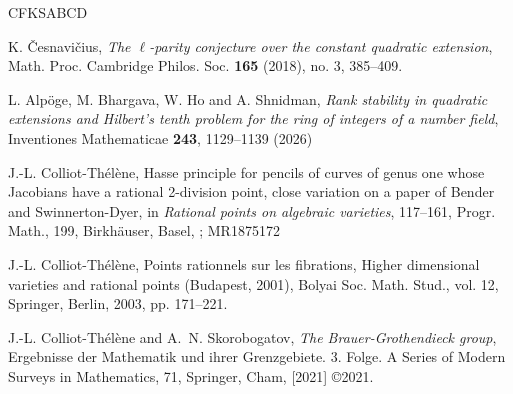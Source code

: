 \documentclass[10pt]{amsart}
\numberwithin{equation}{section}
\theoremstyle{remark}
\theoremstyle{definition}
\theoremstyle{definition}
\theoremstyle{definition}
\theoremstyle{definition}
\theoremstyle{definition}
\theoremstyle{definition}
\theoremstyle{definition}
\theoremstyle{definition}
\begin{document}
\begin{thebibliography}{CFKSABCD}
  
  
  
     

 K. \v{C}esnavi\v{c}ius, \textit{The {$\ell$}-parity conjecture over the constant quadratic
         extension}, Math. Proc. Cambridge Philos. Soc. \textbf{165} (2018), no. 3, 385--409.  
              
 L. Alpöge, M. Bhargava,  W. Ho   and A. Shnidman, {\it Rank stability in quadratic extensions and Hilbert’s tenth problem for the ring of integers of a number field}, Inventiones Mathematicae \textbf{243}, 1129–1139 (2026)
              
 J.-L. Colliot-Th\'el\`ene, Hasse principle for pencils of curves of genus one whose Jacobians have a rational 2-division point, close variation on a paper of Bender and Swinnerton-Dyer, in {\it Rational points on algebraic varieties}, 117--161, Progr. Math., 199, Birkh\"auser, Basel, ; MR1875172

   J.-L. Colliot-Thélène, Points rationnels sur les fibrations, Higher dimensional varieties and rational points (Budapest, 2001), Bolyai Soc. Math. Stud., vol. 12, Springer, Berlin, 2003, pp. 171–221.
              
    J.-L. Colliot-Th\'el\`ene and A.~N. Skorobogatov, {\it The Brauer-Grothendieck group}, Ergebnisse der Mathematik und ihrer Grenzgebiete. 3. Folge. A Series of Modern Surveys in Mathematics, 71, Springer, Cham, [2021] \copyright 2021.
 

\end{thebibliography}
\end{document}
